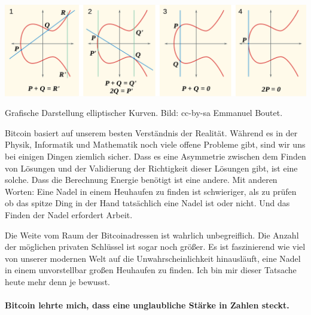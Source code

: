 \begin{center}
  \includegraphics[width=\textwidth]{assets/images/elliptic-curve-examples.png}
  \caption{Grafische Darstellung elliptischer Kurven. Bild: cc-by-sa Emmanuel Boutet.}
  \label{fig:elliptic-curve-examples}
\end{center}

Bitcoin basiert auf unserem besten Verständnis der Realität. Während es in der
Physik, Informatik und Mathematik noch viele offene Probleme gibt, sind wir uns
bei einigen Dingen ziemlich sicher. Dass es eine Asymmetrie zwischen dem Finden
von Lösungen und der Validierung der Richtigkeit dieser Lösungen gibt, ist eine
solche. Dass die Berechnung Energie benötigt ist eine andere. Mit anderen
Worten: Eine Nadel in einem Heuhaufen zu finden ist schwieriger, als zu prüfen
ob das spitze Ding in der Hand tatsächlich eine Nadel ist oder nicht. Und das
Finden der Nadel erfordert Arbeit.

Die Weite vom Raum der Bitcoinadressen ist wahrlich unbegreiflich. Die Anzahl
der möglichen privaten Schlüssel ist sogar noch größer. Es ist faszinierend wie
viel von unserer modernen Welt auf die Unwahrscheinlichkeit hinausläuft, eine
Nadel in einem unvorstellbar großen Heuhaufen zu finden. Ich bin mir dieser
Tatsache heute mehr denn je bewusst.

\paragraph{Bitcoin lehrte mich, dass eine unglaubliche Stärke in Zahlen steckt.}

